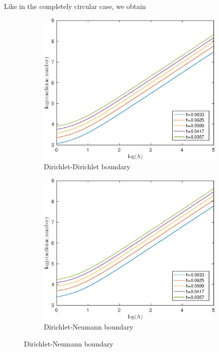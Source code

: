 \documentclass[12pt]{article}
\begin{document}
Like in the completely circular case, we obtain
\begin{figure}[h!]
\centering
\begin{subfigure}{0.4\textwidth}
\includegraphics[width=\textwidth]{cond-A-2D-pcircular-DD}
\caption{Dirichlet-Dirichlet boundary}
\end{subfigure}
\hfill
\begin{subfigure}{0.4\textwidth}
\includegraphics[width=\textwidth]{cond-A-2D-pcircular-DN}
\caption{Dirichlet-Neumann boundary}
\end{subfigure}

\end{figure}
\end{document}
